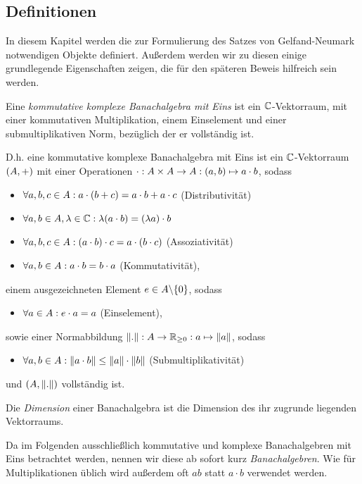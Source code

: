 \subsection{Definitionen}

In diesem Kapitel werden die zur Formulierung des Satzes von Gelfand-Neumark notwendigen Objekte definiert. Außerdem werden wir zu diesen einige grundlegende Eigenschaften zeigen, die für den späteren Beweis hilfreich sein werden.

\begin{defn}[Banachalgebra]
Eine \emph{kommutative komplexe Banachalgebra mit Eins} ist ein $\mathbb{C}$-Vektorraum, mit einer kommutativen Multiplikation, einem Einselement und einer submultiplikativen Norm, bezüglich der er vollständig ist.

D.h. eine kommutative komplexe Banachalgebra mit Eins ist ein $\mathbb{C}$-Vektorraum $(A, +)$ mit einer Operationen $\cdot: A \times A \to A: (a,b) \mapsto a\cdot b$, sodass
\begin{itemize}
	\item $\forall a,b,c  \in A: a\cdot(b+c) = a\cdot b + a\cdot c$ (Distributivität)
	\item $\forall a,b \in A, \lambda \in \mathbb{C}: \lambda(a\cdot b) = (\lambda a)\cdot b$
	\item $\forall a,b,c \in A: (a\cdot b)\cdot c = a \cdot (b \cdot c)$ (Assoziativität)
	\item $\forall a, b \in A: a\cdot b = b \cdot a$ (Kommutativität),	
\end{itemize}
einem ausgezeichneten Element $e \in A \backslash \{0\}$, sodass
\begin{itemize}
	\item $\forall a \in A: e\cdot a = a$ (Einselement),
\end{itemize}
sowie einer Normabbildung $\left\lVert.\right\rVert: A \to \mathbb{R}_{\geq0}: a \mapsto \left\lVert a\right\rVert$, sodass
\begin{itemize}
	\item $\forall a,b \in A: \left\lVert a \cdot b\right\rVert \leq \left\lVert a\right\rVert \cdot \left\lVert b\right\rVert$ (Submultiplikativität)
\end{itemize}
und $(A, \left\lVert.\right\rVert)$ vollständig ist.

Die \emph{Dimension} einer Banachalgebra ist die Dimension des ihr zugrunde liegenden Vektorraums.
\end{defn}

\begin{bem}
Da im Folgenden ausschließlich kommutative und komplexe Banachalgebren mit Eins betrachtet werden, nennen wir diese ab sofort kurz \emph{Banachalgebren}. Wie für Multiplikationen üblich wird außerdem oft $ab$ statt $a \cdot b$ verwendet werden.
\end{bem}

